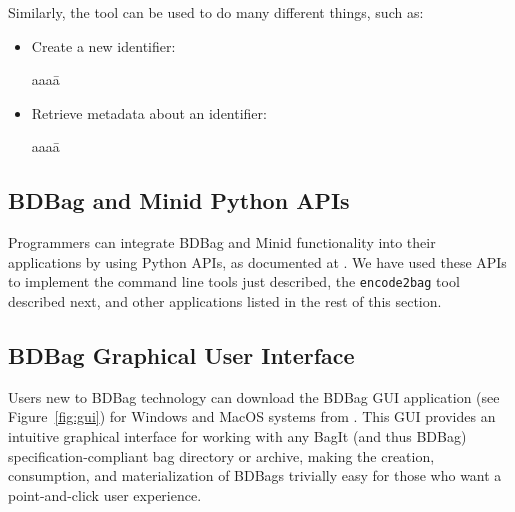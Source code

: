 \documentclass[11pt]{article}
\begin{document}
\noindent
Similarly, the  tool can be used to do many different things, such as:

\vspace{-1ex}

\begin{itemize}
\item
Create a new identifier:
\vspace{-2ex}
\begin{tabbing}
aaaa\=\kill
\>
\end{tabbing}

\vspace{-2ex}

\item
Retrieve metadata about an identifier:
\vspace{-2ex}
\begin{tabbing}
aaaa\=\kill
\>
\end{tabbing}
\end{itemize}

\vspace{-2ex}

\noindent{}



\subsection{BDBag and Minid Python APIs} 

Programmers can integrate BDBag and Minid functionality into their applications by using
Python APIs, as documented at .
We have used these APIs to implement the command line tools just described,
the \texttt{encode2bag} tool described next, and other applications listed in the rest of this section. 

\subsection{BDBag Graphical User Interface}

Users new to BDBag technology can download the BDBag GUI application (see Figure~\ref{fig:gui}) for Windows and MacOS systems from
.  This GUI provides an intuitive graphical interface for
working with any BagIt (and thus BDBag) specification-compliant bag directory or archive, making the creation, consumption, and
materialization of BDBags trivially easy for those who want a point-and-click user experience.
\end{document}
